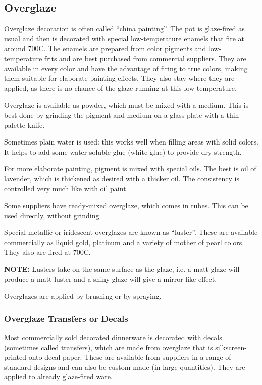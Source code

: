 \subsection{Overglaze}
Overglaze decoration is often called ``china painting''. The pot is glaze-fired 
as usual and then is decorated with special low-temperature enamels that fire 
at around 700\degree C. The enamels are prepared from color pigments and 
low-temperature frits and are best purchased from commercial suppliers. They 
are available in every color and have the advantage of firing to true colors, 
making them suitable for elaborate painting effects. They also stay where they 
are applied, as there is no chance of the glaze running at this low temperature.

Overglaze is available as powder, which must be mixed with a medium. This is 
best done by grinding the pigment and medium on a glass plate with a thin 
palette knife.

Sometimes plain water is used: this works well when filling areas with solid 
colors. It helps to add some water-soluble glue (white glue) to provide dry 
strength.

For more elaborate painting, pigment is mixed with special oils. The best is 
oil of lavender, which is thickened as desired with a thicker oil. The 
consistency is controlled very much like with oil paint.

Some suppliers have ready-mixed overglaze, which comes in tubes. This can be 
used directly, without grinding.

Special metallic or iridescent overglazes are known as ``luster''. These are 
available commercially as liquid gold, platinum and a variety of mother of 
pearl colors. They also are fired at 700\degree C. 

\textbf{NOTE:} Lusters take on the same surface as the glaze, i.e. a matt glaze 
will produce a matt luster and a shiny glaze will give a mirror-like effect.

Overglazes are applied by brushing or by spraying.
\subsubsection{Overglaze Transfers or Decals}
Most commercially sold decorated dinnerware is decorated with decals (sometimes 
called transfers), which are made from overglaze that is silkscreen-printed 
onto decal paper. These are available from suppliers in a range of standard 
designs and can also be custom-made (in large quantities). They are applied to 
already glaze-fired ware.

